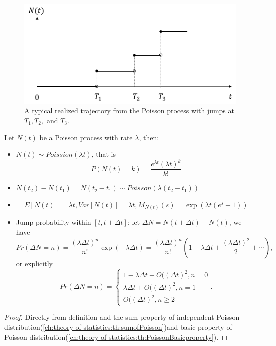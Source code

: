 \begin{refsection}
\begin{figure}[H]
\centering
\includegraphics[width=0.7\linewidth]{../figures/stochasticProcess/stochasticProcess/poissonProcessTrajectory}
\caption{A typical realized trajectory from the Poisson process with jumps at $T_1,T_2,$ and $T_3$.}
\label{fig:poissonProcessTrajectory}
\end{figure}


\begin{lemma}\label{ch:theory-of-stochastic-process:th:PoissonProcessbasicproperties}
	Let $N(t)$ be a Poisson process with rate $\lambda$, then:
	\begin{itemize}
		\item $N(t) \sim Poission(\lambda t)$, that is
		$$P(N(t) = k) = \frac{e^{\lambda t}(\lambda t)^k}{k!}$$
		\item $N(t_2)-N(t_1) = N(t_2-t_1) \sim Poisson(\lambda(t_2-t_1))$
		\item $$E[N(t)] = \lambda t, Var[N(t)] = \lambda t, M_{N(t)}(s) = \exp(\lambda t(e^s-1))$$
		\item Jump probability within $[t,t+\Delta t]$: let $\Delta N = N(t+\Delta t) - N(t)$, we have
		$$Pr(\Delta N = n) = \frac{(\lambda\Delta t)^n}{n!} \exp(-\lambda \Delta t) = \frac{(\lambda\Delta t)^n}{n!}(1 - \lambda\Delta t + \frac{(\lambda \Delta t)^2}{2} + \cdots),$$
		or explicitly
		$$Pr(\Delta N = n) = \begin{cases*}
		1 - \lambda\Delta t + O((\Delta t)^2, n = 0\\
		\lambda\Delta t + O((\Delta t)^2, n = 1\\
		O((\Delta t)^2, n\geq 2
		\end{cases*}.$$
	\end{itemize}
\end{lemma}
\begin{proof}
	Directly from definition and the sum property of independent Poisson distribution(\autoref{ch:theory-of-statistics:th:sumofPoisson})and basic property of Poisson distribution(\autoref{ch:theory-of-statistics:th:PoissonBasicproperty}).
\end{proof}


\end{refsection}

